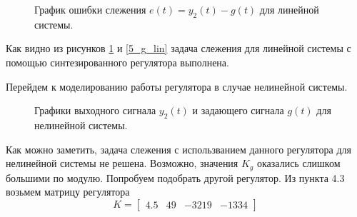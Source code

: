 \begin{figure}[!h]
	\caption{График ошибки слежения $e(t) = y_2(t)-g(t)$ для линейной системы.}
	\label{5_e_lin}
\end{figure}

Как видно из рисунков \ref{5_e_lin} и \ref{5_g_lin} задача слежения для линейной системы с помощью синтезированного регулятора выполнена.


Перейдем к моделированию работы регулятора в случае нелинейной системы.  

\begin{figure}[!h]
	\caption{Графики выходного сигнала $y_2(t)$ и задающего сигнала $g(t)$ для нелинейной системы.}
	\label{5_g_nonlin}
\end{figure}

Как можно заметить, задача слежения с использванием данного регулятора для нелинейной системы не решена. Возможно, значения $K_g$ оказались слишком большими по модулю. Попробуем подобрать другой регулятор. Из пункта 4.3 возьмем матрицу регулятора $$K = \begin{bmatrix}
4.5 & 49 & -3219 & -1334
\end{bmatrix}$$

